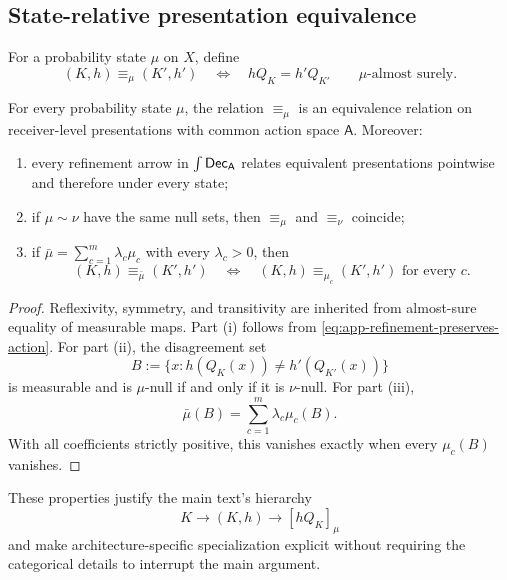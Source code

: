 \subsection{State-relative presentation equivalence}

For a probability state $\mu$ on $X$, define
\[
(K,h)\equiv_\mu(K',h')
\quad\Longleftrightarrow\quad
hQ_K=h'Q_{K'}
\qquad\mu\text{-almost surely}.
\]

\begin{proposition}
\label{prop:app-state-relative-presentation-equivalence}
For every probability state $\mu$, the relation $\equiv_\mu$ is an equivalence relation on receiver-level presentations with common action space $\mathsf A$. Moreover:
\begin{enumerate}[label=(\roman*)]
\item every refinement arrow in $\int\mathsf{Dec}_{\mathsf A}$ relates equivalent presentations pointwise and therefore under every state;
\item if $\mu\sim\nu$ have the same null sets, then $\equiv_\mu$ and $\equiv_\nu$ coincide;
\item if $\bar\mu=\sum_{c=1}^m\lambda_c\mu_c$ with every $\lambda_c>0$, then
\[
(K,h)\equiv_{\bar\mu}(K',h')
\quad\Longleftrightarrow\quad
(K,h)\equiv_{\mu_c}(K',h')
\text{ for every }c.
\]
\end{enumerate}
\end{proposition}

\begin{proof}
Reflexivity, symmetry, and transitivity are inherited from almost-sure equality of measurable maps. Part (i) follows from \eqref{eq:app-refinement-preserves-action}. For part (ii), the disagreement set
\[
B:=\{x:h(Q_K(x))\neq h'(Q_{K'}(x))\}
\]
is measurable and is $\mu$-null if and only if it is $\nu$-null. For part (iii),
\[
\bar\mu(B)=\sum_{c=1}^m\lambda_c\mu_c(B).
\]
With all coefficients strictly positive, this vanishes exactly when every $\mu_c(B)$ vanishes.
\end{proof}

These properties justify the main text's hierarchy
\[
K\longrightarrow(K,h)\longrightarrow[hQ_K]_\mu
\]
and make architecture-specific specialization explicit without requiring the categorical details to interrupt the main argument.
